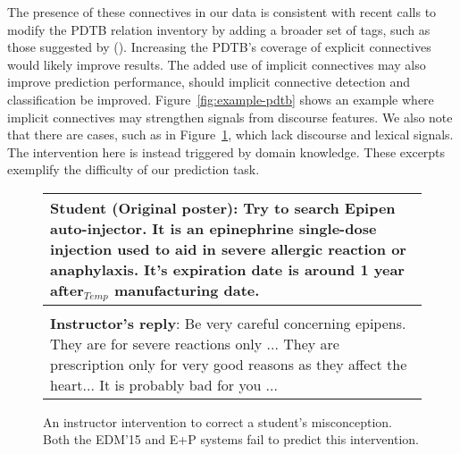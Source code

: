 \documentclass[letterpaper]{article}
\begin{document}
\noindent The presence of these connectives in our data is consistent with recent 
calls \cite{forbesriley2016} to modify the PDTB relation inventory by 
adding a broader set of tags, such as those suggested by \citeauthor{tonelli2010} 
(\citeyear{tonelli2010}). Increasing the PDTB's coverage of explicit connectives 
would likely improve results.
The added use of implicit connectives may also 
improve prediction performance, should 
implicit connective detection and classification be improved. 
Figure~\ref{fig:example-pdtb} shows an example where implicit connectives may 
strengthen signals from discourse features. We also note that there are cases, 
such as in Figure~\ref{fig:example-danger}, which lack discourse and lexical 
signals. The intervention here is instead triggered by domain knowledge. These 
excerpts exemplify the difficulty of our prediction task.\\

\begin{figure}[t]
\small 
\begin{tabular}{|p{7.8cm}|}
\hline 

\textbf{Student (Original poster)}: Try to search Epipen auto-injector. 
It is an epinephrine single-dose injection used to aid in severe 
allergic reaction or anaphylaxis. It's expiration date 
is around 1 year \textbf{after}$_{Temp}$ manufacturing date. \\

\hline \\

\textbf{Instructor's reply}: Be very careful concerning epipens. They are for 
severe reactions only ... They are prescription only for very good reasons as 
they affect the heart... It is probably bad for you ... \\

\hline

\end{tabular}
\caption{An instructor intervention to correct a student's misconception. 
Both the EDM'15 and E+P %
systems fail to predict this intervention.  
} 
\label{fig:example-danger}
\end{figure}
\end{document}
